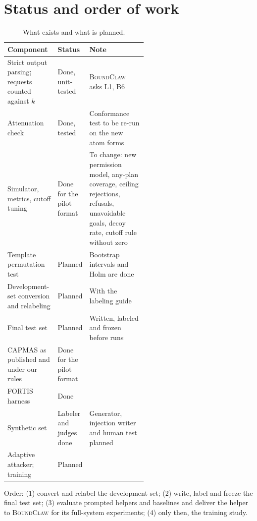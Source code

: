\documentclass[10pt]{article}
\newcommand{\BC}{{\mdseries\textsc{BoundClaw}}}
\begin{document}
\section{Status and order of work}\label{sec:status}
\begin{table}[H]\centering\small
\begin{tabularx}{\linewidth}{L{0.36\linewidth}L{0.2\linewidth}Y}
\toprule
Component & Status & Note \\
\midrule
Strict output parsing; requests counted against $k$ & Done, unit-tested & \BC{} asks L1, B6 \\
Attenuation check & Done, tested & Conformance test to be re-run on the new atom forms \\
Simulator, metrics, cutoff tuning & Done for the pilot format & To change: new permission model, any-plan coverage,
ceiling rejections, refusals, unavoidable goals, decoy rate, cutoff rule without zero \\
Template permutation test & Planned & Bootstrap intervals and Holm are done \\
Development-set conversion and relabeling & Planned & With the labeling guide \\
Final test set & Planned & Written, labeled and frozen before runs \\
CAPMAS as published and under our rules & Done for the pilot format & \\
FORTIS harness & Done & \\
Synthetic set & Labeler and judges done & Generator, injection writer and human test planned \\
Adaptive attacker; training & Planned & \\
\bottomrule
\end{tabularx}
\caption{What exists and what is planned.}\label{tab:status}
\end{table}
Order: (1) convert and relabel the development set; (2) write, label and freeze the final test set; (3) evaluate prompted
helpers and baselines and deliver the helper to \BC{} for its full-system experiments; (4) only then, the training study.
\end{document}

